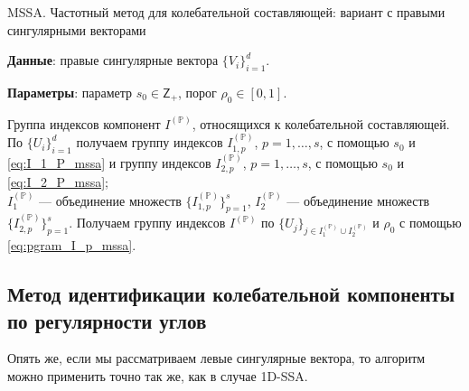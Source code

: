 \documentclass[specialist,
               substylefile = spbu.rtx,
               subf,href,colorlinks=true, 12pt]{disser}
\begin{document}
\begin{algorithm}[!hhh]
\caption{MSSA. Частотный метод для колебательной составляющей: вариант с правыми сингулярными векторами}
\label{alg:mssa_pgram_2}
\begin{algorithmic}[1]
\REQUIRE 
\item \textbf{Данные}: правые сингулярные вектора $\{V_i\}_{i=1}^{d}$.
\item \textbf{Параметры}: параметр $s_0 \in \mathsf{Z}_{+}$, порог $\rho_0 \in [0,1]$.

\ENSURE Группа индексов компонент $I^{(\mathbb{P})}$, относящихся к колебательной составляющей.
\STATE  
По $\{U_i\}_{i=1}^{d}$ получаем группу индексов $I_{1,p}^{(\mathbb{P})}$, $p=1,\ldots,s$, с помощью $s_0$ и \eqref{eq:I_1_P_mssa} и группу индексов $I_{2,p}^{(\mathbb{P})}$, $p=1,\ldots,s$, с помощью $s_0$ и \eqref{eq:I_2_P_mssa};\\
$I_1^{(\mathbb{P})}$ --- объединение множеств $\{ I_{1,p}^{(\mathbb{P})} \}_{p=1}^{s}$, $I_2^{(\mathbb{P})}$ --- объединение множеств $\{ I_{2,p}^{(\mathbb{P})} \}_{p=1}^{s}$.
\STATE Получаем группу индексов $I^{(\mathbb{P})}$ по $\{U_j\}_{j \in I_1^{(\mathbb{P})} \cup I_2^{(\mathbb{P})}}$ и $\rho_0$ с помощью \eqref{eq:pgram_I_p_mssa}.
\end{algorithmic}
\end{algorithm}


%

\subsection{Метод идентификации колебательной компоненты по регулярности углов} 
Опять же, если мы рассматриваем левые сингулярные вектора, то алгоритм можно применить точно так же, как в случае 1D-SSA.
\end{document}
